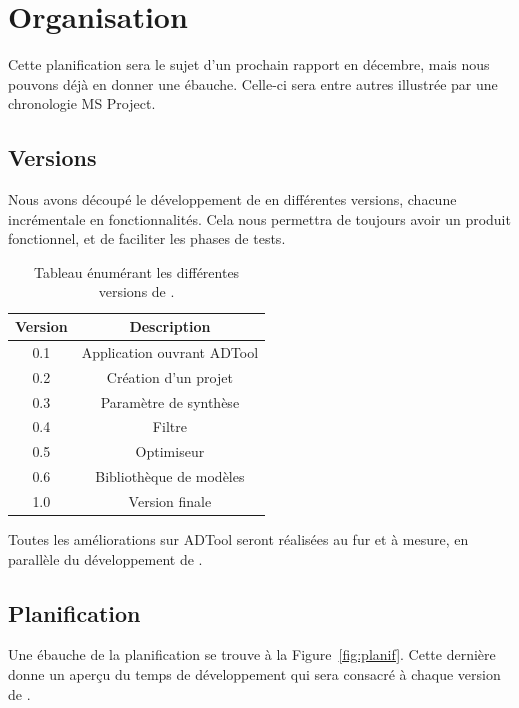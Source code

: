\section{Organisation}
	 Cette planification sera le sujet d'un prochain rapport en décembre, mais nous pouvons déjà en donner une ébauche. Celle-ci sera entre autres illustrée par une chronologie MS Project.

	\subsection{Versions}
		Nous avons découpé le développement de \glasir{} en différentes versions, chacune incrémentale en fonctionnalités. Cela nous permettra de toujours avoir un produit fonctionnel, et de faciliter les phases de tests.

		\begin{table}[h!]
			\begin{center}
			\begin{tabular}{|c|c|}
				\hline
				Version & Description\\
				\hline
				0.1 & Application ouvrant ADTool\\
				\hline
				0.2 & Création d'un projet\\
				\hline
				0.3 & Paramètre de synthèse\\
				\hline
				0.4 & Filtre\\
				\hline
				0.5 & Optimiseur\\
				\hline
				0.6 & Bibliothèque de modèles\\
				\hline
				1.0 & Version finale\\
				\hline
			\end{tabular}
			\end{center}
			\caption{Tableau énumérant les différentes versions de \glasir{}.}
		\end{table} 

		Toutes les améliorations sur ADTool seront réalisées au fur et à mesure, en parallèle du développement de \glasir{}.

	\subsection{Planification}
		Une ébauche de la planification se trouve à la {\sc Figure}~\ref{fig:planif}. Cette dernière donne un aperçu du temps de développement qui sera consacré à chaque version de \glasir{}. 

